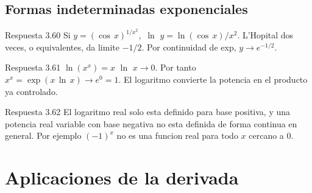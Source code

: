 \documentclass[10pt,a4paper,oneside,openany]{book}
\begin{document}
\section{Formas indeterminadas exponenciales}
\begin{PSevenAnswerFixed}{Respuesta 3.60}
Si \(y=(\cos\,x)^{1/x^{2}},\) \(\ln\) \(y=\ln(\cos\,x)/x^{2}\). L'Hopital dos veces, o equivalentes, da limite \(-1/2\). Por continuidad de exp, \(y\to e^{-1/2}\).
\end{PSevenAnswerFixed}
\begin{PSevenAnswerFixed}{Respuesta 3.61}
\(\ln(x^x)=x\) \(\ln\) \(x\to 0\). Por tanto \(x^x=\exp(x\,\ln\,x)\to e^{0}=1\). El logaritmo convierte la potencia en el producto ya controlado.
\end{PSevenAnswerFixed}
\begin{PSevenAnswerFixed}{Respuesta 3.62}
El logaritmo real solo esta definido para base positiva, y una potencia real variable con base negativa no esta definida de forma continua en general. Por ejemplo \((-1)^x\) no es una funcion real para todo \(x\) cercano a \(0\).
\end{PSevenAnswerFixed}
\chapter{Aplicaciones de la derivada}
\end{document}
